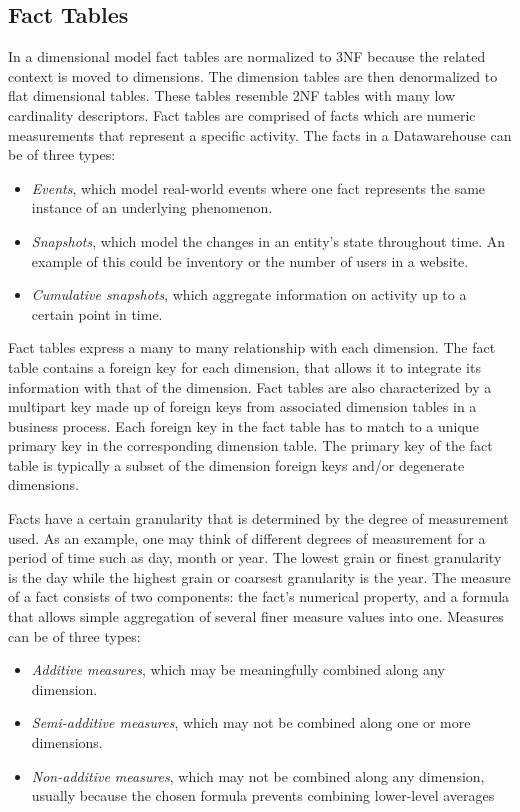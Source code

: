 \documentclass[]{article}
\begin{document}
\subsection{Fact Tables} %
\label{sub:fact_tables}

In a dimensional model fact tables are normalized to 3NF because the related context is moved to dimensions. The dimension tables are
then denormalized to flat dimensional tables. These tables resemble 2NF tables with many low cardinality descriptors. Fact tables are
comprised of facts which are numeric measurements that represent a specific activity. The facts in a Datawarehouse can be of three types:
\begin{itemize}
	\item \emph{Events}, which model real-world events where one fact represents the same instance of an underlying phenomenon. 
	\item \emph{Snapshots}, which model the changes in an entity's state throughout time. An example of this could be inventory or the number of users in a website.
	\item \emph{Cumulative snapshots}, which aggregate information on activity up to a certain point in time.
\end{itemize}
Fact tables express a many to many relationship with each dimension. The fact table contains a foreign key for each dimension, that
allows it to integrate its information with that of the dimension. Fact tables are also characterized by a multipart key made up of
foreign keys from associated dimension tables in a business process. Each foreign key in the fact table has to match to a unique
primary key in the corresponding dimension table. The primary key of the fact table is typically a subset of the dimension foreign keys
and/or degenerate dimensions.

Facts have a certain granularity that is determined by the degree of measurement used. As an example, one may think of different degrees
of measurement for a period of time such as day, month or year. The lowest grain or finest granularity is the day while the highest
grain or coarsest granularity is the year. The measure of a fact consists of two components: the fact's numerical property, and a
formula that allows simple aggregation of several finer measure values into one. Measures can be of three types:
\begin{itemize}
\item \emph{Additive measures}, which may be meaningfully combined along any dimension.
\item \emph{Semi-additive measures}, which may not be combined along one or more dimensions.
\item \emph{Non-additive measures}, which may not be combined along any dimension, usually because the chosen formula prevents combining lower-level averages
\end{itemize}
\end{document}
